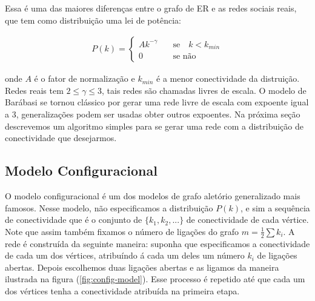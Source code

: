 \documentclass[a4paper,11pt]{report}
\begin{document}
Essa \'e uma das maiores diferen\c{c}as entre o grafo de ER e as redes sociais reais, que tem como distribui\c{c}\~ao uma lei de pot\^encia:

\begin{eqnarray}
P(k)=\left\{\begin{array}{cl}Ak^{-\gamma}&\quad \mbox{se}\quad k<k_{min}\\0&\quad \mbox{se n\~ao}
\end{array}\right.  
\end{eqnarray}

onde $A$ \'e o fator de normaliza\c{c}\~ao e $k_{min}$ \'e a menor conectividade da distrui\c{c}\~ao. Redes reais tem $2\le \gamma\le 3$, tais redes s\~ao chamadas livres de escala. O modelo de Bar\'abasi se tornou cl\'assico por gerar uma rede livre de escala com expoente igual a 3, generaliza\c{c}\~oes podem ser usadas obter outros expoentes. Na pr\'oxima se\c{c}\~ao descrevemos um algoritmo simples para se gerar uma rede com a distribui\c{c}\~ao de conectividade que desejarmos.


\subsection{Modelo Configuracional}

O modelo configuracional \'e um dos modelos de grafo alet\'orio generalizado mais famosos. Nesse modelo, n\~ao especificamos a distribui\c{c}\~ao $P(k)$, e sim a sequ\^encia de conectividade que \'e o conjunto de $\{k_1, k_2, ...\}$ de conectividade de cada v\'ertice. Note que assim tamb\'em fixamos o n\'umero de liga\c{c}\~oes do grafo $m=\frac{1}{2}\sum k_i$. A rede \'e constru\'ida da seguinte maneira: suponha que especificamos a conectividade de cada um dos v\'ertices, atribu\'indo \'a cada um deles um n\'umero $k_i$ de liga\c{c}\~oes abertas. Depois escolhemos duas liga\c{c}\~oes abertas e as ligamos da maneira ilustrada na figura (\ref{fig:config-model}). Esse processo \'e repetido at\'e que cada um dos v\'ertices tenha a conectividade atribu\'ida na primeira etapa. 
\end{document}
